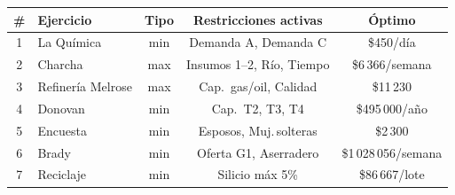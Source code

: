 \documentclass[12pt,a4paper]{article}
\begin{document}
\begin{center}
\renewcommand{\arraystretch}{1.5}
\begin{tabular}{@{}clccc@{}}
\toprule
\textbf{\#} & \textbf{Ejercicio} & \textbf{Tipo} & \textbf{Restricciones activas} & \textbf{Óptimo}\\
\midrule
1 & La Química       & min & Demanda A, Demanda C       & \$450/día\\
2 & Charcha          & max & Insumos 1--2, Río, Tiempo  & \$6\,366/semana\\
3 & Refinería Melrose & max & Cap.\ gas/oil, Calidad     & \$11\,230\\
4 & Donovan          & min & Cap.\ T2, T3, T4           & \$495\,000/año\\
5 & Encuesta         & min & Esposos, Muj.\,solteras    & \$2\,300\\
6 & Brady            & min & Oferta G1, Aserradero      & \$1\,028\,056/semana\\
7 & Reciclaje        & min & Silicio máx 5\%            & \$86\,667/lote\\
\bottomrule
\end{tabular}
\end{center}
\end{document}
